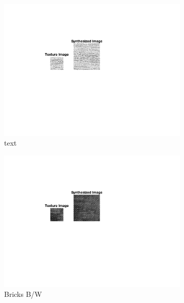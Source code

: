 \documentclass[10pt,twocolumn,letterpaper]{article}
\begin{document}
\begin{figure}
\begin{subfigure}[h]{0.33\textwidth}
       \centering
       \includegraphics[trim={4.5cm 7cm 8.0cm 3cm}, clip, scale=1.5, width=\textwidth]{../results/syn_final/result_text_B_40.png}
       \caption{text}
       \label{fig:text_res}
   \end{subfigure}
   \hfill
   \begin{subfigure}[h]{0.33\textwidth}
       \centering
       \includegraphics[trim={4.5cm 7cm 8.0cm 3cm}, clip, scale=1.5, width=\textwidth]{../results/syn_final/result_D1_B_40.png}
       \caption{Bricks B/W}
       \label{fig:bricksbw_res}
   \end{subfigure}
   \begin{subfigure}[h]{0.33\textwidth}
         \centering

\end{subfigure}
\end{figure}
\end{document}
